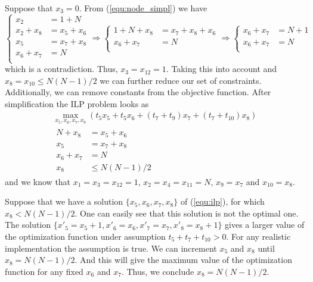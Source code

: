 \documentclass[12pt,a4paper,titlepage,oneside]{article}
\begin{document}
\begin{itemize}
Suppose that $x_3 = 0$.
From (\ref{equ:node_simpl}) we have
\begin{equation*}
	\left\{\begin{aligned}
		x_2			&= 1 + N\\
		x_2 + x_8	&= x_5 + x_6\\
		x_5			&= x_7 + x_8\\
		x_6 + x_7	&= N\\
	\end{aligned}\right.
\Rightarrow
	\left\{\begin{aligned}
		1 + N + x_8	&= x_7 + x_8 + x_6\\
		x_6 + x_7	&= N\\
	\end{aligned}\right.
\Rightarrow
	\left\{\begin{aligned}
		x_6 + x_7 	&= N+1\\
		x_6 + x_7	&= N\\
	\end{aligned}\right.
\end{equation*}
which is a contradiction.
Thus, $x_3 = x_{12} = 1$.
Taking this into account and $x_8 = x_{10} \leq N(N-1)/2$ we can further reduce our set of constraints.
Additionally, we can remove constants from the objective function.
After simplification the ILP problem looks as
\begin{equation}
\begin{aligned}
	\max_{x_5, x_6, x_7, x_8} \left(t_5 x_5 + t_5 x_6 + (t_7+t_9)x_7 + (t_7+t_{10}) x_8 \right)\\
	\left.\begin{aligned}
		N + x_8		&= x_5 + x_6\\
		x_5			&= x_7 + x_8\\
		x_6 + x_7	&= N\\
		x_8			&\leq N(N-1)/2
	\end{aligned}\right.
\end{aligned}
\label{equ:ilp}
\end{equation}
and we know that $x_1 = x_3 = x_{12} = 1$, $x_2 = x_4 = x_{11} = N$, $x_9 = x_7$ and $x_{10} = x_8$.

Suppose that we have a solution $\{x_5, x_6, x_7, x_8\}$ of (\ref{equ:ilp}), for which $x_8 < N(N-1)/2$.
One can easily see that this solution is not the optimal one.
The solution $\{x'_5 = x_5+1, x'_6 = x_6, x'_7 = x_7, x'_8 = x_8+1\}$ gives a larger value of the optimization function under assumption $t_5 + t_7 + t_{10} > 0$.
For any realistic implementation the assumption is true.
We can increment $x_5$ and $x_8$ until $x_8 = N(N-1)/2$.
And this will give the maximum value of the optimization function for any fixed $x_6$ and $x_7$.
Thus, we conclude $x_8 = N(N-1)/2$.


\end{itemize}
\end{document}
